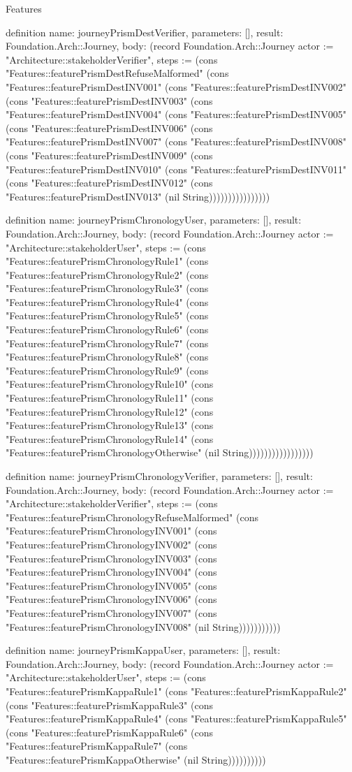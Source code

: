 \begin{lexlean}{Features}
\begin{semanticmodule}
definition{
  name: journeyPrismDestVerifier,
  parameters: [],
  result: Foundation.Arch::Journey,
  body: (record Foundation.Arch::Journey {actor := "Architecture::stakeholderVerifier", steps := (cons "Features::featurePrismDestRefuseMalformed" (cons "Features::featurePrismDestINV001" (cons "Features::featurePrismDestINV002" (cons "Features::featurePrismDestINV003" (cons "Features::featurePrismDestINV004" (cons "Features::featurePrismDestINV005" (cons "Features::featurePrismDestINV006" (cons "Features::featurePrismDestINV007" (cons "Features::featurePrismDestINV008" (cons "Features::featurePrismDestINV009" (cons "Features::featurePrismDestINV010" (cons "Features::featurePrismDestINV011" (cons "Features::featurePrismDestINV012" (cons "Features::featurePrismDestINV013" (nil String)))))))))))))))})
}

definition{
  name: journeyPrismChronologyUser,
  parameters: [],
  result: Foundation.Arch::Journey,
  body: (record Foundation.Arch::Journey {actor := "Architecture::stakeholderUser", steps := (cons "Features::featurePrismChronologyRule1" (cons "Features::featurePrismChronologyRule2" (cons "Features::featurePrismChronologyRule3" (cons "Features::featurePrismChronologyRule4" (cons "Features::featurePrismChronologyRule5" (cons "Features::featurePrismChronologyRule6" (cons "Features::featurePrismChronologyRule7" (cons "Features::featurePrismChronologyRule8" (cons "Features::featurePrismChronologyRule9" (cons "Features::featurePrismChronologyRule10" (cons "Features::featurePrismChronologyRule11" (cons "Features::featurePrismChronologyRule12" (cons "Features::featurePrismChronologyRule13" (cons "Features::featurePrismChronologyRule14" (cons "Features::featurePrismChronologyOtherwise" (nil String))))))))))))))))})
}

definition{
  name: journeyPrismChronologyVerifier,
  parameters: [],
  result: Foundation.Arch::Journey,
  body: (record Foundation.Arch::Journey {actor := "Architecture::stakeholderVerifier", steps := (cons "Features::featurePrismChronologyRefuseMalformed" (cons "Features::featurePrismChronologyINV001" (cons "Features::featurePrismChronologyINV002" (cons "Features::featurePrismChronologyINV003" (cons "Features::featurePrismChronologyINV004" (cons "Features::featurePrismChronologyINV005" (cons "Features::featurePrismChronologyINV006" (cons "Features::featurePrismChronologyINV007" (cons "Features::featurePrismChronologyINV008" (nil String))))))))))})
}

definition{
  name: journeyPrismKappaUser,
  parameters: [],
  result: Foundation.Arch::Journey,
  body: (record Foundation.Arch::Journey {actor := "Architecture::stakeholderUser", steps := (cons "Features::featurePrismKappaRule1" (cons "Features::featurePrismKappaRule2" (cons "Features::featurePrismKappaRule3" (cons "Features::featurePrismKappaRule4" (cons "Features::featurePrismKappaRule5" (cons "Features::featurePrismKappaRule6" (cons "Features::featurePrismKappaRule7" (cons "Features::featurePrismKappaOtherwise" (nil String)))))))))})
}


\end{semanticmodule}
\end{lexlean}
